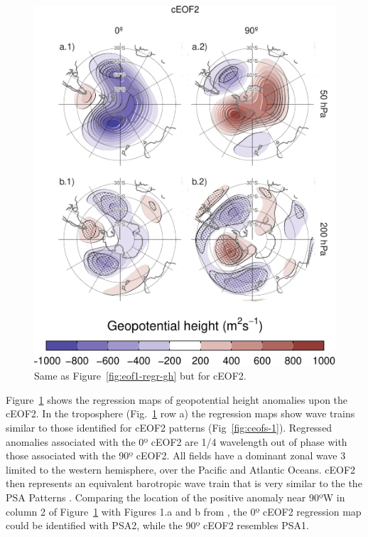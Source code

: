 \documentclass[pdflatex,lineno,sn-basic]{sn-jnl}
\theoremstyle{thmstyleone}%
\theoremstyle{thmstyletwo}%
\theoremstyle{thmstylethree}%
\begin{document}
\begin{figure}
\centering
\includegraphics{shceof_files/figure-latex/eof2-regr-gh-1.pdf}
\caption{\label{fig:eof2-regr-gh}Same as Figure~\ref{fig:eof1-regr-gh} but for cEOF2.}
\end{figure}

Figure~\ref{fig:eof2-regr-gh} shows the regression maps of geopotential height anomalies upon the cEOF2.
In the troposphere (Fig.~\ref{fig:eof2-regr-gh} row a) the regression maps show wave trains similar to those identified for cEOF2 patterns (Fig~\ref{fig:ceofs-1}).
Regressed anomalies associated with the 0º cEOF2 are 1/4 wavelength out of phase with those associated with the 90º cEOF2.
All fields have a dominant zonal wave 3 limited to the western hemisphere, over the Pacific and Atlantic Oceans.
cEOF2 then represents an equivalent barotropic wave train that is very similar to the the PSA Patterns \citep{mo2001}.
Comparing the location of the positive anomaly near 90ºW in column 2 of Figure~\ref{fig:eof2-regr-gh} with Figures 1.a and b from \citet{mo2001}, the 0º cEOF2 regression map could be identified with PSA2, while the 90º cEOF2 resembles PSA1.
\end{document}
